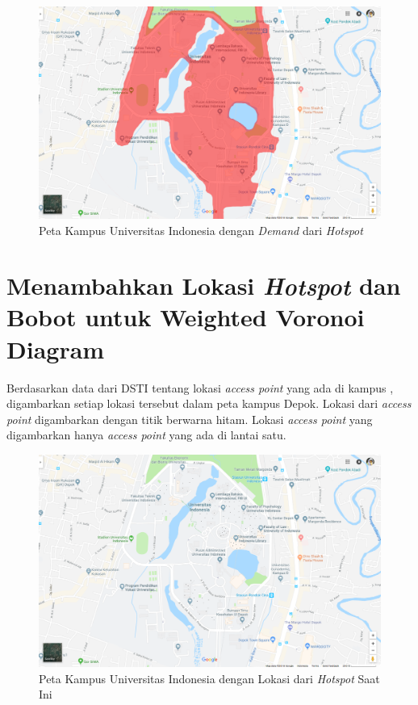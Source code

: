 \begin{figure}
	\centering
	\includegraphics[width=14cm]{pics/ui-demand.png}
	\caption{Peta Kampus Universitas Indonesia dengan \textit{Demand} dari \textit{Hotspot}}
	\label{fig:uiDemand}
\end{figure} 

\section{Menambahkan Lokasi \textit{Hotspot} dan Bobot untuk Weighted Voronoi Diagram}

Berdasarkan data dari DSTI tentang lokasi \textit{access point} yang ada di kampus {\ui}, digambarkan setiap lokasi tersebut dalam peta kampus {\ui} Depok. Lokasi dari \textit{access point} digambarkan dengan titik berwarna hitam. Lokasi \textit{access point} yang digambarkan hanya \textit{access point} yang ada di lantai satu.

\begin{figure}
	\centering
	\includegraphics[width=14cm]{pics/ui-current.png}
	\caption{Peta Kampus Universitas Indonesia dengan Lokasi dari \textit{Hotspot} Saat Ini}
	\label{fig:uiCurrent}
\end{figure} 

